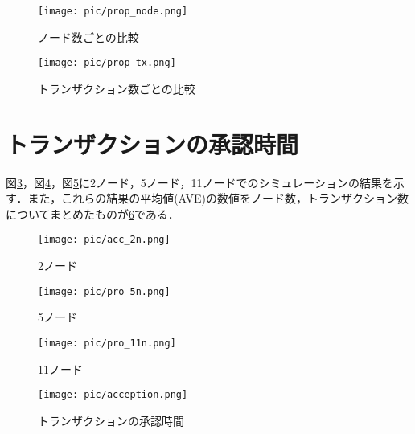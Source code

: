 \documentclass[japanese, macos]{KU2}
\begin{document}
\begin{figure}[htbp]
  \begin{center}
   \texttt{[image: pic/prop\_node.png]}
  \caption{ノード数ごとの比較}
  \label{fig:prop_node}
  \end{center}
\end{figure}
\begin{figure}[htbp]
  \begin{center}
   \texttt{[image: pic/prop\_tx.png]}
  \caption{トランザクション数ごとの比較}
  \label{fig:prop_tx}
    \end{center}
\end{figure}

\section{トランザクションの承認時間}
図\ref{fig:acc_2n}，図\ref{fig:acc_5n}，図\ref{fig:acc_11n}に2ノード，5ノード，11ノードでのシミュレーションの結果を示す．また，これらの結果の平均値(AVE)の数値をノード数，トランザクション数についてまとめたものが\ref{fig:acception}である．

\begin{figure}[htbp]
  \begin{center} 
    \texttt{[image: pic/acc\_2n.png]}
    \caption{2ノード}
    \label{fig:acc_2n} 
  \end{center}
\end{figure}
\begin{figure}[htbp]
  \begin{center} 
    \texttt{[image: pic/pro\_5n.png]}
    \caption{5ノード}
    \label{fig:acc_5n} 
  \end{center}
\end{figure}
\begin{figure}[htbp]
  \begin{center} 
    \texttt{[image: pic/pro\_11n.png]}
    \caption{11ノード}
    \label{fig:acc_11n} 
  \end{center}
\end{figure}
\begin{figure}[htbp]
  \begin{center} 
    \texttt{[image: pic/acception.png]}
    \caption{トランザクションの承認時間}
    \label{fig:acception} 
  \end{center}
\end{figure}
\end{document}
